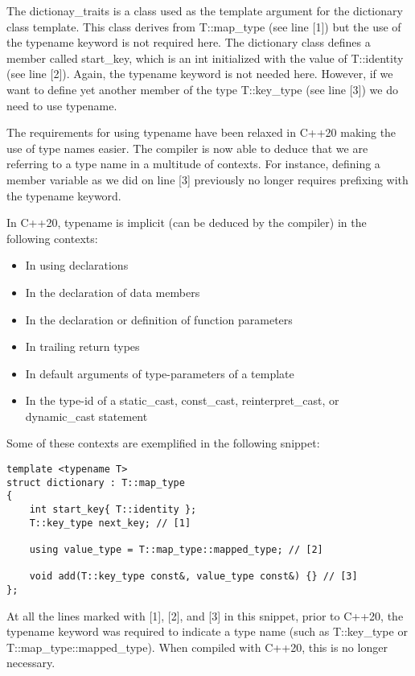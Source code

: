 The dictionay\_traits is a class used as the template argument for the dictionary class template. This class derives from T::map\_type (see line [1]) but the use of the typename keyword is not required here. The dictionary class defines a member called start\_key, which is an int initialized with the value of T::identity (see line [2]). Again, the typename keyword is not needed here. However, if we want to define yet another member of the type T::key\_type (see line [3]) we do need to use typename.

The requirements for using typename have been relaxed in C++20 making the use of type names easier. The compiler is now able to deduce that we are referring to a type name in a multitude of contexts. For instance, defining a member variable as we did on line [3] previously no longer requires prefixing with the typename keyword.

In C++20, typename is implicit (can be deduced by the compiler) in the following contexts:

\begin{itemize}
\item
In using declarations

\item
In the declaration of data members

\item
In the declaration or definition of function parameters

\item
In trailing return types

\item
In default arguments of type-parameters of a template

\item
In the type-id of a static\_cast, const\_cast, reinterpret\_cast, or dynamic\_cast statement
\end{itemize}

Some of these contexts are exemplified in the following snippet:

\begin{lstlisting}[style=styleCXX]
template <typename T>
struct dictionary : T::map_type
{
	int start_key{ T::identity };
	T::key_type next_key; // [1]
	
	using value_type = T::map_type::mapped_type; // [2]
	
	void add(T::key_type const&, value_type const&) {} // [3]
};
\end{lstlisting}

At all the lines marked with [1], [2], and [3] in this snippet, prior to C++20, the typename keyword was required to indicate a type name (such as T::key\_type or T::map\_type::mapped\_type). When compiled with C++20, this is no longer necessary.

